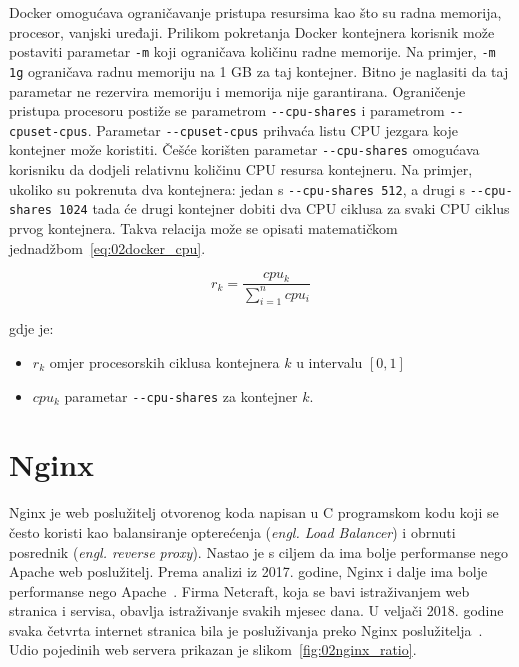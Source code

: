 Docker omogućava ograničavanje pristupa resursima kao što su radna memorija, procesor, vanjski
uređaji. Prilikom pokretanja Docker kontejnera korisnik može postaviti parametar \texttt{-m} koji
ograničava količinu radne memorije. Na primjer, \texttt{-m 1g} ograničava radnu memoriju na 1 GB za
taj kontejner. Bitno je naglasiti da taj parametar ne rezervira memoriju i memorija nije
garantirana.  Ograničenje pristupa procesoru postiže se parametrom \texttt{-{}-cpu-shares} i
parametrom \texttt{-{}-cpuset-cpus}.  Parametar \texttt{-{}-cpuset-cpus} prihvaća listu CPU jezgara
koje kontejner može koristiti. Češće korišten parametar \texttt{-{}-cpu-shares} omogućava korisniku
da dodjeli relativnu količinu CPU resursa kontejneru.  Na primjer, ukoliko su pokrenuta dva
kontejnera: jedan s \texttt{-{}-cpu-shares 512}, a drugi s \texttt{-{}-cpu-shares 1024} tada će
drugi kontejner dobiti dva CPU ciklusa za svaki CPU ciklus prvog kontejnera. Takva relacija može se
opisati matematičkom jednadžbom~\ref{eq:02docker_cpu}.

\begin{equation}
   r_k = \frac{cpu_k} {\sum_{i=1}^{n} cpu_i}
   \label{eq:02docker_cpu}
\end{equation}

gdje je:

\begin{itemize}
    \item $r_k$ omjer procesorskih ciklusa kontejnera $k$ u intervalu $[0, 1]$
    \item $cpu_k$ parametar \texttt{-{}-cpu-shares} za kontejner $k$.
\end{itemize}

\section{Nginx}
Nginx je web poslužitelj otvorenog koda napisan u C programskom kodu koji se često koristi kao
balansiranje opterećenja (\textit{engl. Load Balancer}) i obrnuti posrednik (\textit{engl. reverse
proxy}). Nastao je s ciljem da ima bolje performanse nego Apache web poslužitelj. Prema analizi iz
2017. godine, Nginx i dalje ima bolje performanse nego Apache~\citep{nguyen2017comparative}.
Firma Netcraft, koja se bavi istraživanjem web stranica i servisa, obavlja istraživanje svakih
mjesec dana. U veljači 2018. godine svaka četvrta internet stranica bila je posluživanja preko Nginx
poslužitelja~\citep{Netcraft2018}. Udio pojedinih web servera prikazan je
slikom~\ref{fig:02nginx_ratio}.

